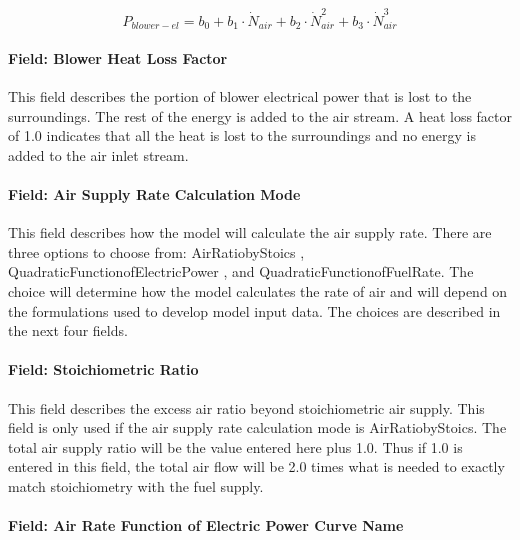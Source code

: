 \begin{equation}
{P_{blower - el}} = {b_0} + {b_1} \cdot {\dot N_{air}} + {b_2} \cdot \dot N_{air}^2 + {b_3} \cdot \dot N_{air}^3
\end{equation}

\paragraph{Field: Blower Heat Loss Factor}\label{field-blower-heat-loss-factor}

This field describes the portion of blower electrical power that is lost to the surroundings. The rest of the energy is added to the air stream. A heat loss factor of 1.0 indicates that all the heat is lost to the surroundings and no energy is added to the air inlet stream.

\paragraph{Field: Air Supply Rate Calculation Mode}\label{field-air-supply-rate-calculation-mode}

This field describes how the model will calculate the air supply rate. There are three options to choose from: AirRatiobyStoics , QuadraticFunctionofElectricPower , and QuadraticFunctionofFuelRate. The choice will determine how the model calculates the rate of air and will depend on the formulations used to develop model input data. The choices are described in the next four fields.

\paragraph{Field: Stoichiometric Ratio}\label{field-stoichiometric-ratio}

This field describes the excess air ratio beyond stoichiometric air supply. This field is only used if the air supply rate calculation mode is AirRatiobyStoics. The total air supply ratio will be the value entered here plus 1.0. Thus if 1.0 is entered in this field, the total air flow will be 2.0 times what is needed to exactly match stoichiometry with the fuel supply.

\paragraph{Field: Air Rate Function of Electric Power Curve Name}\label{field-air-rate-function-of-electric-power-curve-name}

